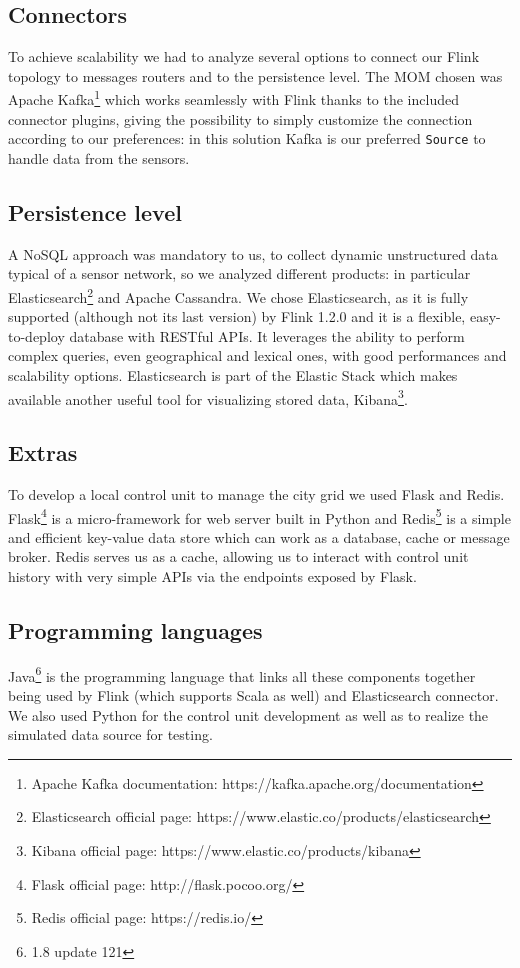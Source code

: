 \subsection{Connectors}
To achieve scalability we had to analyze several options to connect our Flink topology to messages routers and to the persistence level. The MOM chosen was Apache Kafka\footnote{Apache Kafka documentation: https://kafka.apache.org/documentation} which works seamlessly with Flink thanks to the included connector plugins, giving the possibility to simply customize the connection according to our preferences: in this solution Kafka is our preferred \texttt{Source} to handle data from the sensors. 
\subsection{Persistence level}
A NoSQL approach was mandatory to us, to collect dynamic unstructured data typical of a sensor network, so we analyzed different products: in particular Elasticsearch\footnote{Elasticsearch official page: https://www.elastic.co/products/elasticsearch} and Apache Cassandra. We chose Elasticsearch, as it is fully supported (although not its last version) by Flink 1.2.0 and it is a flexible, easy-to-deploy database with RESTful APIs. It leverages the ability to perform complex queries, even geographical and lexical ones, with good performances and scalability options. Elasticsearch is part of the Elastic Stack which makes available another useful tool for visualizing stored data, Kibana\footnote{Kibana official page: https://www.elastic.co/products/kibana}.

\subsection{Extras}
To develop a local control unit to manage the city grid we used Flask and Redis. Flask\footnote{Flask official page: http://flask.pocoo.org/} is a micro-framework for web server built in Python and Redis\footnote{Redis official page: https://redis.io/} is a simple and efficient key-value data store which can work as a database, cache or message broker. Redis serves us as a cache, allowing us to interact with control unit history with very simple APIs via the endpoints exposed by Flask.

\subsection{Programming languages}
Java\footnote{1.8 update 121} is the programming language that links all these components together being used by Flink (which supports Scala as well) and Elasticsearch connector. We also used Python for the control unit development as well as to realize the simulated data source for testing.


